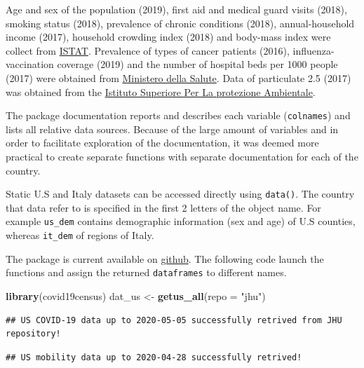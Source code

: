 \documentclass[12pt,halfline,a4paper,]{ouparticle}
\newenvironment{Shaded}{\begin{snugshade}}{\end{snugshade}}
\newcommand{\DataTypeTok}[1]{\textcolor[rgb]{0.13,0.29,0.53}{#1}}
\newcommand{\KeywordTok}[1]{\textcolor[rgb]{0.13,0.29,0.53}{\textbf{#1}}}
\newcommand{\NormalTok}[1]{#1}
\newcommand{\StringTok}[1]{\textcolor[rgb]{0.31,0.60,0.02}{#1}}
\begin{document}
Age and sex of the population (2019), first aid and medical guard visits
(2018), smoking status (2018), prevalence of chronic conditions (2018),
annual-household income (2017), household crowding index (2018) and
body-mass index were collect from
\href{http://dati.istat.it/?lang=en}{ISTAT}. Prevalence of types of
cancer patients (2016), influenza-vaccination coverage (2019) and the
number of hospital beds per 1000 people (2017) were obtained from
\href{http://www.dati.salute.gov.it/}{Ministero della Salute}. Data of
particulate 2.5 (2017) was obtained from the
\href{https://annuario.isprambiente.it/pon/basic/14}{Istituto Superiore
Per La protezione Ambientale}.

The package documentation reports and describes each variable
(\texttt{colnames}) and lists all relative data sources. Because of the
large amount of variables and in order to facilitate exploration of the
documentation, it was deemed more practical to create separate functions
with separate documentation for each of the country.

Static U.S and Italy datasets can be accessed directly using
\texttt{data()}. The country that data refer to is specified in the
first 2 letters of the object name. For example \texttt{us\_dem}
contains demographic information (sex and age) of U.S counties, whereas
\texttt{it\_dem} of regions of Italy.

The package is current available on
\href{https://github.com/c1au6i0/covid19census}{github}. The following
code launch the functions and assign the returned \texttt{dataframes} to
different names.

\bigskip

\begin{Shaded}
\begin{Highlighting}[]
\KeywordTok{library}\NormalTok{(covid19census)}
\NormalTok{dat_us <-}\StringTok{ }\KeywordTok{getus_all}\NormalTok{(}\DataTypeTok{repo =} \StringTok{"jhu"}\NormalTok{)}
\end{Highlighting}
\end{Shaded}

\begin{verbatim}
## US COVID-19 data up to 2020-05-05 successfully retrived from JHU repository!
\end{verbatim}

\begin{verbatim}
## US mobility data up to 2020-04-28 successfully retrived!
\end{verbatim}
\end{document}
